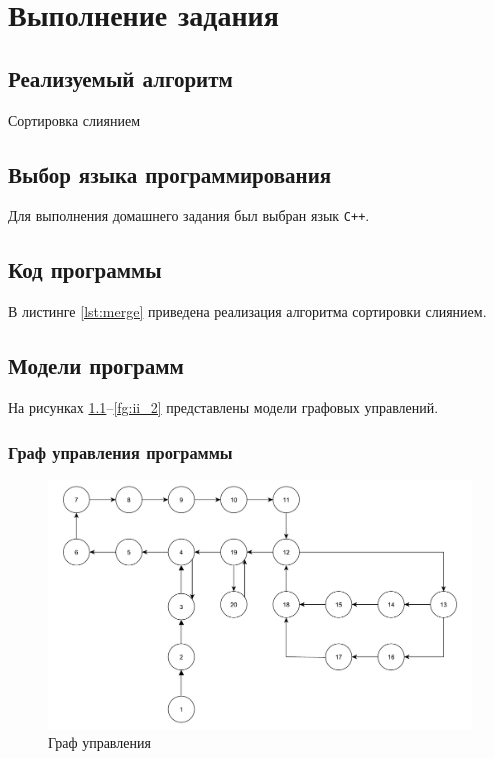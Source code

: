\chapter{Выполнение задания}

\section{Реализуемый алгоритм}
Сортировка слиянием

\section{Выбор языка программирования}
Для выполнения домашнего задания был выбран язык \texttt{C++}.

\section{Код программы}

В листинге \ref{lst:merge} приведена реализация алгоритма сортировки слиянием.



\section{Модели программ}

На рисунках \ref{fg:mg}--\ref{fg:ii_2} представлены модели графовых управлений.

\subsection{Граф управления программы}

\begin{figure}[h]
	\centering
	\includegraphics[height=0.4\textheight]{img/граф_управления.pdf}
	\caption{Граф управления}
	\label{fg:mg}
\end{figure}

